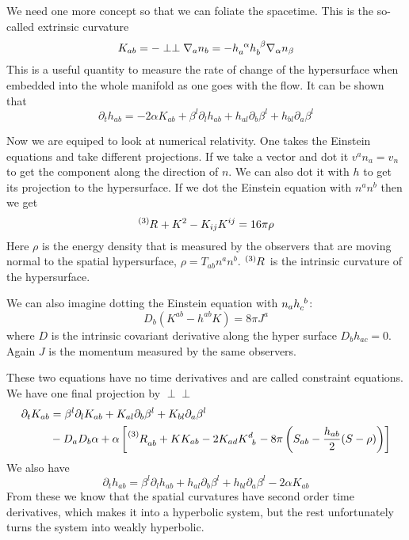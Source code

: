 \documentclass[letterpaper, 11pt]{article}
\numberwithin{equation}{section}
\numberwithin{figure}{section}
\begin{document}
We need one more concept so that we can foliate the spacetime. This is the
so-called extrinsic curvature
\begin{equation}
  \label{eq:20}
  K_{ab} = -\perp \perp \nabla_{a}n_{b} = -\tensor{h}{_{a}^{\alpha}}\tensor{h}{_{b}^{\beta}}\nabla_{\alpha}n_{\beta}
\end{equation}
This is a useful quantity to measure the rate of change of the hypersurface when
embedded into the whole manifold as one goes with the flow. It can be shown that
\begin{equation}
  \label{eq:21}
  \partial_t h_{ab} = -2\alpha K_{ab} + \beta^l\partial_lh_{ab} + h_{al}\partial_{b}\beta^{l} + h_{bl}\partial_{a}\beta^{l}
\end{equation}

Now we are equiped to look at numerical relativity. One takes the Einstein
equations and take different projections. If we take a vector and dot it
$v^{a}n_{a} = v_{n}$ to get the component along the direction of $n$. We can
also dot it with $h$ to get its projection to the hypersurface. If we dot the
Einstein equation with $n^an^{b}$ then we get
\begin{equation}
  \label{eq:22}
  \tensor[^{(3)}]{R}{} + K^{2} - K_{ij}K^{ij} = 16\pi\rho
\end{equation}
Here $\rho$ is the energy density that is measured by the observers that are
moving normal to the spatial hypersurface, $\rho = T_{ab}n^{a}n^{b}$.
$\tensor[^{(3)}]{R}{}$ is the intrinsic curvature of the hypersurface.

We can also imagine dotting the Einstein equation with
$n_{a}\tensor{h}{_{c}^{b}}$:
\begin{equation}
  \label{eq:23}
  D_{b}(K^{ab} - h^{ab}K) = 8\pi J^{a}
\end{equation}
where $D$ is the intrinsic covariant derivative along the hyper surface
$D_{b}h_{ac} = 0$. Again $J$ is the momentum measured by the same observers.

These two equations have no time derivatives and are called constraint
equations. We have one final projection by $\perp\perp$
\begin{equation}
  \label{eq:24}
  \begin{split}
    \partial_tK_{ab} &= \beta^l\partial_lK_{ab} + K_{al}\partial_{b}\beta^l + K_{bl}\partial_a\beta^{l} \\
    &- D_{a}D_{b}\alpha + \alpha \left[ \tensor[^{(3)}]{R}{_{ab}} + K K_{ab} - 2K_{ad}\tensor{K}{^d_{b}} - 8\pi \left( S_{ab} - \frac{h_{ab}}{2}(S - \rho) \right) \right]
  \end{split}
\end{equation}
We also have
\begin{equation}
  \label{eq:25}
  \partial_th_{ab} = \beta^l\partial_lh_{ab} + h_{al}\partial_{b}\beta^{l} + h_{bl}\partial_{a}\beta^{l} - 2\alpha K_{ab}
\end{equation}
From these we know that the spatial curvatures have second order time
derivatives, which makes it into a hyperbolic system, but the rest unfortunately
turns the system into weakly hyperbolic.
\end{document}
